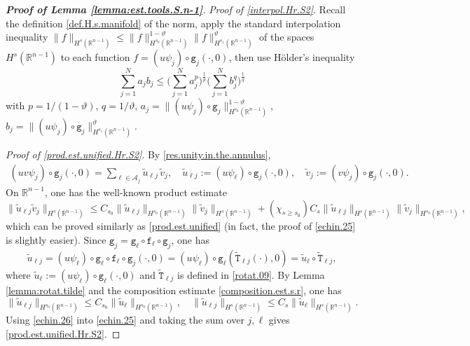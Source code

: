 \documentclass[10pt,reqno,a4paper]{article}
\numberwithin{equation}{section}
\theoremstyle{plain}
\theoremstyle{definition}
\newcommand{\R}{{\mathbb R}}
\newcommand{\mA}{\mathcal{A}}
\renewcommand{\th}{\vartheta}
\begin{document}
\begin{proof}[\textbf{Proof of Lemma \ref{lemma:est.tools.S.n-1}}]
\emph{Proof of \eqref{interpol.Hr.S2}}. 
Recall the definition \eqref{def.H.s.manifold} of the norm, 
apply the standard interpolation inequality 
$\| f \|_{H^s(\R^{n-1})} 
\leq \| f \|_{H^{s_0}(\R^{n-1})}^{1-\th}
\| f \|_{H^{s_1}(\R^{n-1})}^\th$
of the spaces $H^s(\R^{n-1})$ 
to each function $f = (u \psi_j) \circ \mathtt g_j(\cdot, 0)$, 
then use H\"older's inequality 
\[
\sum_{j=1}^N a_j b_j 
\leq \Big( \sum_{j=1}^N a_j^p \Big)^{\frac{1}{p}} 
\Big( \sum_{j=1}^N b_j^q \Big)^{\frac{1}{q}}
\]
with $p = 1/(1-\th)$, $q = 1/\th$, 
$a_j = \| (u \psi_j) \circ \mathtt g_j \|_{H^{s_0}(\R^{n-1})}^{1-\th}$, 
$b_j = \| (u \psi_j) \circ \mathtt g_j \|_{H^{s_1}(\R^{n-1})}^\th$.

\emph{Proof of \eqref{prod.est.unified.Hr.S2}}.
By \eqref{res.unity.in.the.annulus}, 
\begin{align*}
(u v \psi_j) \circ \mathtt g_j (\cdot, 0) 
= \sum_{\ell \in \mA_j} \tilde u_{\ell j} \, \tilde v_j,
\quad 
\tilde u_{\ell j} := (u \psi_\ell) \circ \mathtt g_j (\cdot, 0), 
\quad 
\tilde v_j := (v \psi_j) \circ \mathtt g_j (\cdot, 0).
\end{align*}
On $\R^{n-1}$, one has the well-known product estimate  
\begin{equation} \label{echin.25}
\| \tilde u_{\ell j} \tilde v_j \|_{H^{s}(\R^{n-1})} 
\leq 
C_{s_0} \| \tilde u_{\ell j} \|_{H^{s_0}(\R^{n-1})} 
\| \tilde v_j \|_{H^{s}(\R^{n-1})} 
+ (\chi_{s \geq s_0}) C_s \| \tilde u_{\ell j} \|_{H^{s}(\R^{n-1})} 
\| \tilde v_j \|_{H^{s_0}(\R^{n-1})},
\end{equation}
which can be proved similarly as \eqref{prod.est.unified} 
(in fact, the proof of \eqref{echin.25} is slightly easier).
Since $\mathtt g_j = \mathtt g_\ell \circ \mathtt f_\ell \circ \mathtt g_j$, one has  
\[
\tilde u_{\ell j} 
= (u \psi_\ell) \circ \mathtt g_\ell \circ \mathtt f_\ell \circ \mathtt g_j( \cdot ,0)
= (u \psi_\ell) \circ \mathtt g_\ell (\tilde{\mathtt T}_{\ell j}( \cdot ) , 0)
= \tilde u_\ell \circ \tilde{\mathtt T}_{\ell j},
\]
where $\tilde u_\ell := (u \psi_\ell) \circ \mathtt g_\ell (\cdot, 0)$
and $\tilde{\mathtt T}_{\ell j}$ is defined in \eqref{rotat.09}. 
By Lemma \ref{lemma:rotat.tilde} and the composition estimate 
\eqref{composition.est.s.r}, one has 
\begin{equation}  \label{echin.26}
\| \tilde u_{\ell j} \|_{H^{s_0}(\R^{n-1})} 
\leq C_{s_0} \| \tilde u_\ell \|_{H^{s_0}(\R^{n-1})},
\quad 
\| \tilde u_{\ell j} \|_{H^{s}(\R^{n-1})} 
\leq C_s \| \tilde u_\ell \|_{H^{s}(\R^{n-1})}. 
\end{equation}
Using \eqref{echin.26} into \eqref{echin.25} and taking the sum over $j, \ell$
gives \eqref{prod.est.unified.Hr.S2}.


\end{proof}
\end{document}
